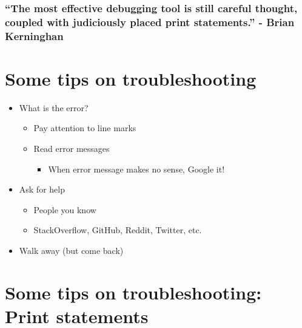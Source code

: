 \documentclass[
]{article}
\providecommand{\tightlist}{%
  \setlength{\itemsep}{0pt}\setlength{\parskip}{0pt}}
\begin{document}
\hypertarget{the-most-effective-debugging-tool-is-still-careful-thought-coupled-with-judiciously-placed-print-statements.---brian-kerninghan}{%
\subsubsection{``The most effective debugging tool is still careful
thought, coupled with judiciously placed print statements.'' - Brian
Kerninghan}\label{the-most-effective-debugging-tool-is-still-careful-thought-coupled-with-judiciously-placed-print-statements.---brian-kerninghan}}

\hypertarget{some-tips-on-troubleshooting}{%
\section{Some tips on
troubleshooting}\label{some-tips-on-troubleshooting}}

\begin{itemize}
\tightlist
\item
  What is the error?

  \begin{itemize}
  \tightlist
  \item
    Pay attention to line marks
  \item
    Read error messages

    \begin{itemize}
    \tightlist
    \item
      When error message makes no sense, Google it!
    \end{itemize}
  \end{itemize}
\item
  Ask for help

  \begin{itemize}
  \tightlist
  \item
    People you know
  \item
    StackOverflow, GitHub, Reddit, Twitter, etc.
  \end{itemize}
\item
  Walk away (but come back)
\end{itemize}

\hypertarget{some-tips-on-troubleshooting-print-statements}{%
\section{Some tips on troubleshooting: Print
statements}\label{some-tips-on-troubleshooting-print-statements}}
\end{document}
